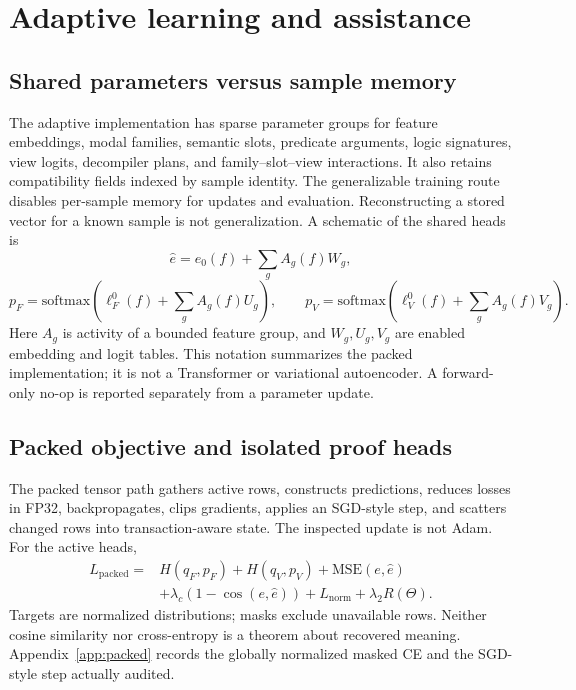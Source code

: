 \documentclass{article}
\begin{document}
\section{Adaptive learning and assistance}
\subsection{Shared parameters versus sample memory}
The adaptive implementation has sparse parameter groups for feature embeddings, modal families, semantic slots, predicate arguments, logic signatures, view logits, decompiler plans, and family--slot--view interactions. It also retains compatibility fields indexed by sample identity. The generalizable training route disables per-sample memory for updates and evaluation. Reconstructing a stored vector for a known sample is not generalization. A schematic of the shared heads is
\begin{equation}
\hat e=e_0(f)+\sum_g A_g(f)W_g,
\label{eq:emb}
\end{equation}
\begin{equation}
p_F=\mathrm{softmax}\!\left(\ell^0_F(f)+\sum_g A_g(f)U_g\right),\qquad
p_V=\mathrm{softmax}\!\left(\ell^0_V(f)+\sum_g A_g(f)V_g\right).
\label{eq:logits}
\end{equation}
Here $A_g$ is activity of a bounded feature group, and $W_g,U_g,V_g$ are enabled embedding and logit tables. This notation summarizes the packed implementation; it is not a Transformer or variational autoencoder. A forward-only no-op is reported separately from a parameter update.

\subsection{Packed objective and isolated proof heads}
The packed tensor path gathers active rows, constructs predictions, reduces losses in FP32, backpropagates, clips gradients, applies an SGD-style step, and scatters changed rows into transaction-aware state. The inspected update is not Adam. For the active heads,
\begin{equation}
\begin{split}
L_{\mathrm{packed}}={}&H(q_F,p_F)+H(q_V,p_V)+\mathrm{MSE}(e,\hat e)\\
&+\lambda_c(1-\cos(e,\hat e))+L_{\mathrm{norm}}+\lambda_2 R(\Theta).
\end{split}
\label{eq:packed}
\end{equation}
Targets are normalized distributions; masks exclude unavailable rows. Neither cosine similarity nor cross-entropy is a theorem about recovered meaning. Appendix~\ref{app:packed} records the globally normalized masked CE and the SGD-style step actually audited.
\end{document}
